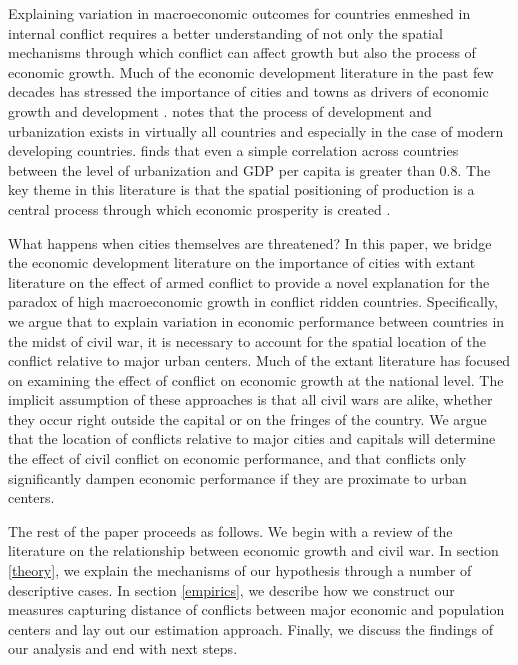 Explaining variation in macroeconomic outcomes for countries enmeshed in internal conflict requires a better understanding of not only the spatial mechanisms through which conflict can affect growth but also the process of economic growth. Much of the economic development literature in the past few decades has stressed the importance of cities and towns as drivers of economic growth and development \citep{hanson:2005}. \citet{venables:2005} notes that the process of development and urbanization exists in virtually all countries and especially in the case of modern developing countries. \citet{henderson:2000} finds that even a simple correlation across countries between the level of urbanization and GDP per capita is greater than 0.8. The key theme in this literature is that the spatial positioning of production is a central process through which economic prosperity is created \citep{krugman:1991}.


What happens when cities themselves are threatened? In this paper, we bridge the economic development literature on the importance of cities with extant literature on the effect of armed conflict to provide a novel explanation for the paradox of high macroeconomic growth in conflict ridden countries. Specifically, we argue that to explain variation in economic performance between countries in the midst of civil war, it is necessary to account for the spatial location of the conflict relative to major urban centers. Much of the extant literature has focused on examining the effect of conflict on economic growth at the national level. The implicit assumption of these approaches is that all civil wars are alike, whether they occur right outside the capital or on the fringes of the country. We argue that the location of conflicts relative to major cities and capitals will determine the effect of civil conflict on economic performance, and that conflicts only significantly dampen economic performance if they are proximate to urban centers. 

The rest of the paper proceeds as follows.  We begin with a review of the literature on the relationship between economic growth and civil war. In section \ref{theory}, we explain the mechanisms of our hypothesis through a number of descriptive cases. In section \ref{empirics}, we describe how we construct our measures capturing distance of conflicts between major economic and population centers and lay out our estimation approach. Finally, we discuss the findings of our analysis and end with next steps. 
